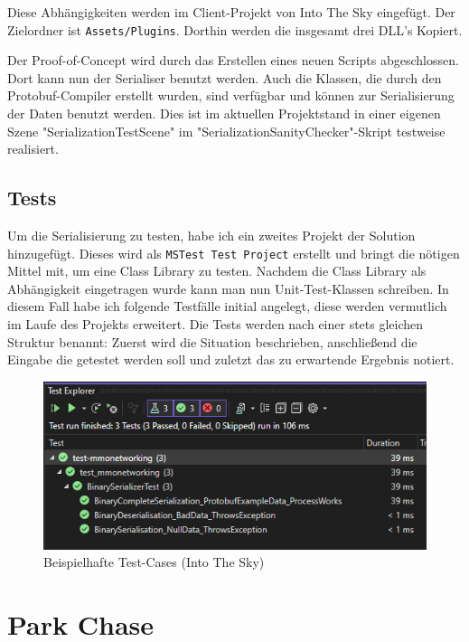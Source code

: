 Diese Abhängigkeiten werden im Client-Projekt von Into The Sky eingefügt. Der Zielordner ist \verb|Assets/Plugins|. Dorthin werden die insgesamt drei DLL's Kopiert.

Der Proof-of-Concept wird durch das Erstellen eines neuen Scripts abgeschlossen. Dort kann nun der Serialiser benutzt werden. Auch die Klassen, die durch den Protobuf-Compiler erstellt wurden, sind verfügbar und können zur Serialisierung der Daten benutzt werden. Dies ist im aktuellen Projektstand in einer eigenen Szene "SerializationTestScene" im "SerializationSanityChecker"-Skript testweise realisiert. 


\subsection{Tests}

Um die Serialisierung zu testen, habe ich ein zweites Projekt der Solution hinzugefügt. Dieses wird als \verb|MSTest Test Project| erstellt und bringt die nötigen Mittel mit, um eine Class Library zu testen. Nachdem die Class Library als Abhängigkeit eingetragen wurde kann man nun Unit-Test-Klassen schreiben. In diesem Fall habe ich folgende Testfälle initial angelegt, diese werden vermutlich im Laufe des Projekts erweitert. Die Tests werden nach einer stets gleichen Struktur benannt: Zuerst wird die Situation beschrieben, anschließend die Eingabe die getestet werden soll und zuletzt das zu erwartende Ergebnis notiert.

\begin{figure}[!h]
	\centering
	\includegraphics[width=16cm]{figures/intotheskytests.png}
	\caption{Beispielhafte Test-Cases (Into The Sky)}
	\label{fig:networkingstructure}
\end{figure}

\section{Park Chase}

